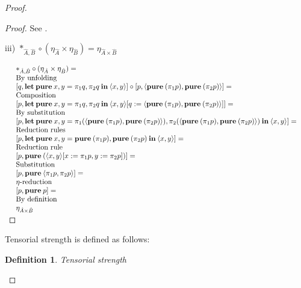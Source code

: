 \documentclass[a4paper]{article}
\newtheorem{defin}{Definition}
\begin{document}
\begin{proof}
\begin{proof}
See \cite{ModalK}.

\vspace{\baselineskip}

iii) $\ast_{\hat{A},\hat{B}} \circ (\eta_{\hat{A}} \times \eta_{\hat{B}}) = \eta_{\hat{A} \times \hat{B}}$

\vspace{\baselineskip}

$\begin{array}{lll}
& \ast_{\hat{A},\hat{B}} \circ (\eta_{\hat{A}} \times \eta_{\hat{B}}) = & \\
& \text{By unfolding} & \\
& [q, {\bf let \: pure \:} x, y = \pi_1 q, \pi_2 q {\: \bf in \:} \langle x, y \rangle] \circ [p, \langle {\bf pure \:} (\pi_1 p), {\bf pure \:} (\pi_2 p) \rangle] = & \\
& \text{Composition}& \\
& [p, {\bf let \: pure \:} x, y = \pi_1 q, \pi_2 q {\: \bf in \:} \langle x, y \rangle [q := \langle {\bf pure \:} (\pi_1 p), {\bf pure \:} (\pi_2 p) \rangle]] = & \\
& \text{By substitution}& \\
& [p, {\bf let \: pure \:} x, y = \pi_1 (\langle {\bf pure \:} (\pi_1 p), {\bf pure \:} (\pi_2 p) \rangle), \pi_2 (\langle {\bf pure \:} (\pi_1 p), {\bf pure \:} (\pi_2 p) \rangle) {\: \bf in \:} \langle x, y \rangle] = & \\
& \text{Reduction rules}& \\
& [p, {\bf let \: pure \:} x, y = {\bf pure \:} (\pi_1 p), {\bf pure \:} (\pi_2 p) {\: \bf in \:} \langle x, y \rangle] = & \\
& \text{Reduction rule}& \\
& [p, {\bf pure \:} (\langle x,y \rangle [x := \pi_1 p, y := \pi_2 p])] = & \\
& \text{Substitution}& \\
& [p, {\bf pure \:} \langle \pi_1 p, \pi_2 p \rangle] = & \\
& \text{$\eta$-reduction}& \\
& [p, {\bf pure \:} p] =& \\
& \text{By definition}& \\
& \eta_{\hat{A} \times \hat{B}}&
\end{array}$

\end{proof}

  Tensorial strength is defined as follows:

\begin{defin} Tensorial strength
  $ $


\end{defin}
\end{proof}
\end{document}
